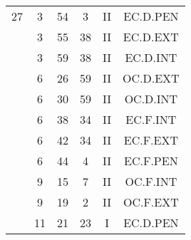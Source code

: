 \documentclass[12pt, a4paper]{article}
\begin{document}
\begin{multicols}{3}
{\begin{tabular}{c c c c c c}
	 	 	 	27 & 3 & 54 & 3 & II & EC.D.PEN\\%
	 	 	 	 & 3 & 55 & 38 & II & EC.D.EXT\\%
	 	 	 	 & 3 & 59 & 38 & II & EC.D.INT\\%
	 	 	 	 & 6 & 26 & 59 & II & OC.D.EXT\\%
	 	 	 	 & 6 & 30 & 59 & II & OC.D.INT\\%
	 	 	 	 & 6 & 38 & 34 & II & EC.F.INT\\%
	 	 	 	 & 6 & 42 & 34 & II & EC.F.EXT\\%
	 	 	 	 & 6 & 44 & 4 & II & EC.F.PEN\\%
	 	 	 	 & 9 & 15 & 7 & II & OC.F.INT\\%
	 	 	 	 & 9 & 19 & 2 & II & OC.F.EXT\\%
	 	 	 	 & 11 & 21 & 23 & I & EC.D.PEN\\%
	 	 \end{tabular}
 	}
\end{multicols}
\end{document}
